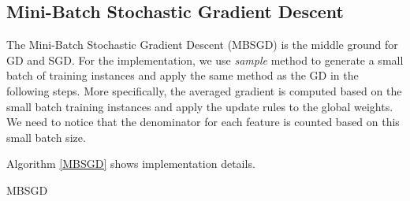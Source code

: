 \documentclass[sigconf]{acmart}
\makeatletter
\def\BState{\State\hskip-\ALG@thistlm}
\makeatother
\begin{document}
\subsection{Mini-Batch Stochastic Gradient Descent}
\label{sec:implementationMBGD}

The Mini-Batch Stochastic Gradient Descent (MBSGD) is the middle ground for GD and SGD. For the implementation, we use \textit{sample} method to generate a small batch of training instances and apply the same method as the GD in the following steps. More specifically, the averaged gradient is computed based on the small batch training instances and apply the update rules to the global weights. We need to notice that the denominator for each feature is counted based on this small batch size. 

Algorithm \ref{MBSGD} shows implementation details. 

\begin{algorithm}
\caption{MBSGD}\label{MBSGD}
\end{algorithm}
\end{document}
